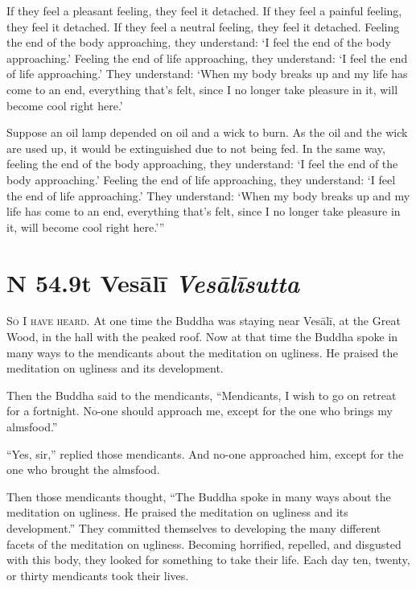 \documentclass[12pt,openany]{book}%
\newcommand*{\suttatitleacronym}[1]{\smaller[2]{#1}\vspace*{.3em}}
\newcommand*{\suttatitletranslation}[1]{\linebreak{#1}}
\newcommand*{\suttatitleroot}[1]{\linebreak\smaller[2]\itshape{#1}}
\newcommand*{\tocacronym}[1]{\hspace*{-3.3em}{#1}\quad}
\newcommand*{\toctranslation}[1]{#1}
\newcommand*{\tocroot}[1]{(\textit{#1})}
\newcommand*{\scevam}[1]{\textsc{#1}}
\begin{document}
If they feel a pleasant feeling, they feel it detached. If they feel a painful feeling, they feel it detached. If they feel a neutral feeling, they feel it detached. Feeling the end of the body approaching, they understand: ‘I feel the end of the body approaching.’ Feeling the end of life approaching, they understand: ‘I feel the end of life approaching.’ They understand: ‘When my body breaks up and my life has come to an end, everything that’s felt, since I no longer take pleasure in it, will become cool right here.’ 

Suppose an oil lamp depended on oil and a wick to burn. As the oil and the wick are used up, it would be extinguished due to not being fed. In the same way, feeling the end of the body approaching, they understand: ‘I feel the end of the body approaching.’ Feeling the end of life approaching, they understand: ‘I feel the end of life approaching.’ They understand: ‘When my body breaks up and my life has come to an end, everything that’s felt, since I no longer take pleasure in it, will become cool right here.’” 

%
\section*{{\suttatitleacronym SN 54.9}{\suttatitletranslation At Vesālī }{\suttatitleroot Vesālīsutta}}
\addcontentsline{toc}{section}{\tocacronym{SN 54.9} \toctranslation{At Vesālī } \tocroot{Vesālīsutta}}

\scevam{So I have heard. }At one time the Buddha was staying near \textsanskrit{Vesālī}, at the Great Wood, in the hall with the peaked roof. Now at that time the Buddha spoke in many ways to the mendicants about the meditation on ugliness. He praised the meditation on ugliness and its development. 

Then the Buddha said to the mendicants, “Mendicants, I wish to go on retreat for a fortnight. No-one should approach me, except for the one who brings my almsfood.” 

“Yes, sir,” replied those mendicants. And no-one approached him, except for the one who brought the almsfood. 

Then those mendicants thought, “The Buddha spoke in many ways about the meditation on ugliness. He praised the meditation on ugliness and its development.” They committed themselves to developing the many different facets of the meditation on ugliness. Becoming horrified, repelled, and disgusted with this body, they looked for something to take their life. Each day ten, twenty, or thirty mendicants took their lives. 
\end{document}

